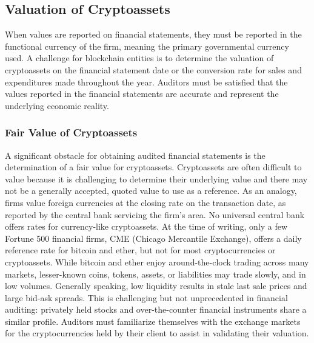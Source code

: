 \subsection{Valuation of Cryptoassets} \label{sec:auditing:framework:valuation}
When values are reported on financial statements, they must be reported in the functional currency of the firm, meaning the primary governmental currency used. A challenge for blockchain entities is to determine the valuation of cryptoassets on the financial statement date or the conversion rate for sales and expenditures made throughout the year. Auditors must be satisfied that the values reported in the financial statements are accurate and represent the underlying economic reality.


\subsubsection{Fair Value of Cryptoassets}
A significant obstacle for obtaining audited financial statements is the determination of a fair value for cryptoassets. Cryptoassets are often difficult to value because it is challenging to determine their underlying value and there may not be a generally accepted, quoted value to use as a reference. As an analogy, firms value foreign currencies at the closing rate on the transaction date, as reported by the central bank servicing the firm's area. No universal central bank offers rates for currency-like cryptoassets. At the time of writing, only a few Fortune 500 financial firms, \eg CME (Chicago Mercantile Exchange), offers a daily reference rate for bitcoin and ether, but not for most cryptocurrencies or cryptoassets.
While bitcoin and ether enjoy around-the-clock trading across many markets, lesser-known coins, tokens, assets, or liabilities may trade slowly, and in low volumes. Generally speaking, low liquidity results in stale last sale prices and large bid-ask spreads. This is challenging but not unprecedented in financial auditing: privately held stocks and over-the-counter financial instruments share a similar profile. Auditors must familiarize themselves with the exchange markets for the cryptocurrencies held by their client to assist in validating their valuation.

